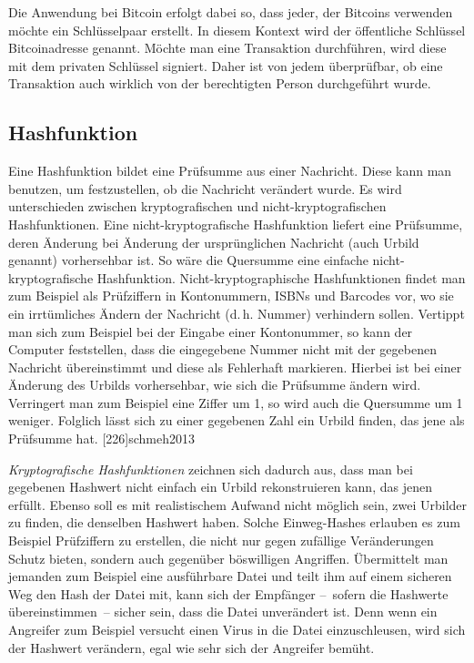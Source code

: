 Die Anwendung bei Bitcoin erfolgt dabei so, dass jeder, der Bitcoins verwenden möchte ein Schlüsselpaar erstellt.
In diesem Kontext wird der öffentliche Schlüssel Bitcoinadresse genannt.
Möchte man eine Transaktion durchführen, wird diese mit dem privaten Schlüssel signiert.
Daher ist von jedem überprüfbar, ob eine Transaktion auch wirklich von der berechtigten Person durchgeführt wurde.

\subsection{Hashfunktion}

Eine Hashfunktion bildet eine Prüfsumme aus einer Nachricht.
Diese kann man benutzen, um festzustellen, ob die Nachricht verändert wurde.
Es wird unterschieden zwischen kryptografischen und nicht-kryptografischen Hashfunktionen.
Eine nicht-kryptografische Hashfunktion liefert eine Prüfsumme, deren Änderung bei Änderung der ursprünglichen Nachricht (auch Urbild genannt) vorhersehbar ist.
So wäre die Quersumme eine einfache nicht-kryptografische Hashfunktion.
Nicht-kryptographische Hashfunktionen findet man zum Beispiel als Prüfziffern in Kontonummern, ISBNs und Barcodes vor, wo sie ein irrtümliches Ändern der Nachricht (d.\,h. Nummer) verhindern sollen.
Vertippt man sich zum Beispiel bei der Eingabe einer Kontonummer, so kann der Computer feststellen, dass die eingegebene Nummer nicht mit der gegebenen Nachricht übereinstimmt und diese als Fehlerhaft markieren.
Hierbei ist bei einer Änderung des Urbilds vorhersehbar, wie sich die Prüfsumme ändern wird.
Verringert man zum Beispiel eine Ziffer um 1, so wird auch die Quersumme um 1 weniger.
Folglich lässt sich zu einer gegebenen Zahl ein Urbild finden, das jene als Prüfsumme hat.
[226]{schmeh2013}

\emph{Kryptografische Hashfunktionen} zeichnen sich dadurch aus, dass man bei gegebenen Hashwert nicht einfach ein Urbild rekonstruieren kann, das jenen erfüllt.
Ebenso soll es mit realistischem Aufwand nicht möglich sein, zwei Urbilder zu finden, die denselben Hashwert haben.
Solche Einweg-Hashes erlauben es zum Beispiel Prüfziffern zu erstellen, die nicht nur gegen zufällige Veränderungen Schutz bieten, sondern auch gegenüber böswilligen Angriffen.
Übermittelt man jemanden zum Beispiel eine ausführbare Datei und teilt ihm auf einem sicheren Weg den Hash der Datei mit, kann sich der Empfänger --~sofern die Hashwerte übereinstimmen~-- sicher sein, dass die Datei unverändert ist.
Denn wenn ein Angreifer zum Beispiel versucht einen Virus in die Datei einzuschleusen, wird sich der Hashwert verändern, egal wie sehr sich der Angreifer bemüht.
